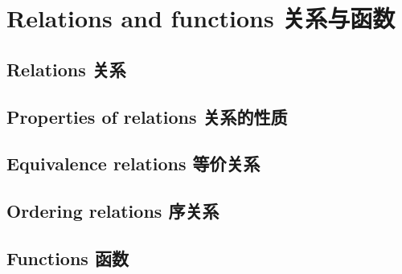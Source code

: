 \chapter{Relations and functions 关系与函数}

\section{Relations 关系}






\newpage

\section{Properties of relations 关系的性质}






\newpage

\section{Equivalence relations 等价关系}





\newpage

\section{Ordering relations 序关系}





\newpage

\section{Functions 函数}


